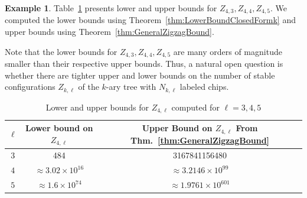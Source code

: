 \documentclass[11pt]{article}
\theoremstyle{remark}
\theoremstyle{definition}
\newtheorem{example}[theorem]{Example}
\begin{document}
\begin{example}
    Table~\ref{tab:ComputationalLowerk4} presents lower and upper bounds for $Z_{4, 3}, Z_{4, 4}, Z_{4, 5}$. We computed the lower bounds using Theorem~\ref{thm:LowerBoundClosedFormk} and upper bounds using Theorem~\ref{thm:GeneralZigzagBound}.
    
    Note that the lower bounds for $Z_{4, 3}, Z_{4, 4}, Z_{4, 5}$ are many orders of magnitude smaller than their respective upper bounds. Thus, a natural open question is whether there are tighter upper and lower bounds on the number of stable configurations $Z_{k, \ell}$ of the $k$-ary tree with $N_{k, \ell}$ labeled chips.
\begin{table}[H]
    \centering
    \begin{tabular}{|c|c|c|}
         \hline $\ell$ &  Lower bound on $Z_{4, \ell}$ & Upper Bound on $Z_{4, \ell}$ From Thm.~\ref{thm:GeneralZigzagBound}\\ \hline
         $3$ & 484 &  3167841156480 \\\hline $4$ & $\approx 3.02\times 10^{16}$  & $\approx 3.2146  \times 10^{99}$ \\ \hline $5$ & $\approx 1.6 \times 10^{74}$ & $\approx 1.9761 \times 10^{601}$\\ \hline
    \end{tabular}
    \caption{Lower and upper bounds for $Z_{4, \ell}$ computed for $\ell=3, 4, 5$}
    \label{tab:ComputationalLowerk4}
\end{table}
\end{example}
\end{document}
